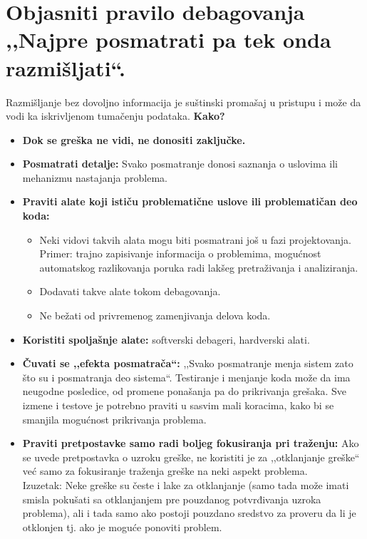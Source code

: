 \documentclass[a4paper]{article}
\begin{document}
\section{Objasniti pravilo debagovanja ,,Najpre posmatrati pa tek onda razmišljati``.}
  Razmišljanje bez dovoljno informacija je suštinski promašaj u pristupu i može da vodi 
  ka iskrivljenom tumačenju podataka. \textbf{Kako?}
  \begin{itemize}
    \item \textbf{Dok se greška ne vidi, ne donositi zaključke.}
    \item \textbf{Posmatrati detalje:} Svako posmatranje donosi saznanja o uslovima ili mehanizmu
          nastajanja problema.
    \item \textbf{Praviti alate koji ističu problematične uslove ili problematičan deo koda:}
          \begin{itemize}
            \item Neki vidovi takvih alata mogu biti posmatrani još u fazi projektovanja. Primer:
                  trajno zapisivanje informacija o problemima, mogućnost automatskog razlikovanja
                  poruka radi lakšeg pretraživanja i analiziranja.  
            \item Dodavati takve alate tokom debagovanja.
            \item Ne bežati od privremenog zamenjivanja delova koda.
          \end{itemize}
    \item \textbf{Koristiti spoljašnje alate:} softverski debageri, hardverski alati.
    \item \textbf{Čuvati se ,,efekta posmatrača``:} ,,Svako posmatranje menja sistem zato što su
          i posmatranja deo sistema``. Testiranje i menjanje koda može da ima neugodne posledice,
          od promene ponašanja pa do prikrivanja grešaka. Sve izmene i testove je potrebno
          praviti u sasvim mali koracima, kako bi se smanjila mogućnost prikrivanja problema.
    \item \textbf{Praviti pretpostavke samo radi boljeg fokusiranja pri traženju:} Ako se uvede
          pretpostavka o uzroku greške, ne koristiti je za ,,otklanjanje greške`` već 
          samo za fokusiranje traženja greške na neki aspekt problema. \\
          Izuzetak: Neke greške su česte i lake za otklanjanje (samo tada može imati smisla
          pokušati sa otklanjanjem pre pouzdanog potvrđivanja uzroka problema), ali i tada
          samo ako postoji pouzdano sredstvo za proveru da li je otklonjen tj. ako je
          moguće ponoviti problem.
  \end{itemize}
\end{document}
